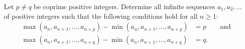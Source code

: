 Let $p \neq q$ be coprime positive integers. Determine all infinite sequences $a_1, a_2, \ldots$ of positive integers such that the following conditions hold for all $n \geq 1$:
\begin{align*}
\max(a_n, a_{n+1}, \ldots, a_{n+p}) - \min(a_n, a_{n+1}, \ldots, a_{n+p}) &= p \qquad \text{and} \\
\max(a_n, a_{n+1}, \ldots, a_{n+q}) - \min(a_n, a_{n+1}, \ldots, a_{n+q}) &= q.
\end{align*}
